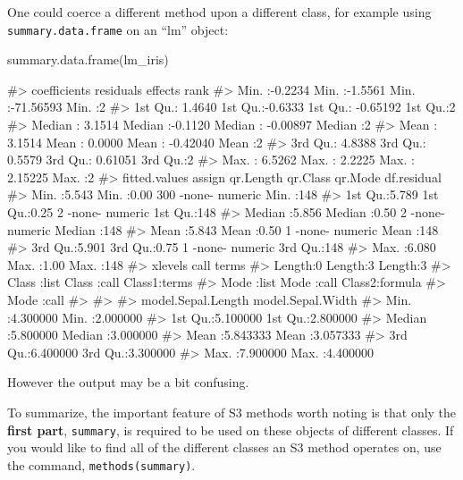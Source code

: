 One could coerce a different method upon a different class, for example
using \texttt{summary.data.frame} on an ``lm'' object:

\begin{Schunk}
\begin{Sinput}
summary.data.frame(lm_iris)
\end{Sinput}
\begin{Soutput}
#>   coefficients       residuals          effects               rank  
#>  Min.   :-0.2234   Min.   :-1.5561   Min.   :-71.56593   Min.   :2  
#>  1st Qu.: 1.4640   1st Qu.:-0.6333   1st Qu.: -0.65192   1st Qu.:2  
#>  Median : 3.1514   Median :-0.1120   Median : -0.00897   Median :2  
#>  Mean   : 3.1514   Mean   : 0.0000   Mean   : -0.42040   Mean   :2  
#>  3rd Qu.: 4.8388   3rd Qu.: 0.5579   3rd Qu.:  0.61051   3rd Qu.:2  
#>  Max.   : 6.5262   Max.   : 2.2225   Max.   :  2.15225   Max.   :2  
#>  fitted.values       assign     qr.Length  qr.Class  qr.Mode  df.residual 
#>  Min.   :5.543   Min.   :0.00   300      -none-   numeric    Min.   :148  
#>  1st Qu.:5.789   1st Qu.:0.25     2      -none-   numeric    1st Qu.:148  
#>  Median :5.856   Median :0.50     2      -none-   numeric    Median :148  
#>  Mean   :5.843   Mean   :0.50     1      -none-   numeric    Mean   :148  
#>  3rd Qu.:5.901   3rd Qu.:0.75     1      -none-   numeric    3rd Qu.:148  
#>  Max.   :6.080   Max.   :1.00                                Max.   :148  
#>    xlevels         call         terms        
#>  Length:0      Length:3      Length:3        
#>  Class :list   Class :call   Class1:terms    
#>  Mode  :list   Mode  :call   Class2:formula  
#>                              Mode  :call     
#>                                              
#>                                              
#>  model.Sepal.Length  model.Sepal.Width 
#>  Min.   :4.300000    Min.   :2.000000  
#>  1st Qu.:5.100000    1st Qu.:2.800000  
#>  Median :5.800000    Median :3.000000  
#>  Mean   :5.843333    Mean   :3.057333  
#>  3rd Qu.:6.400000    3rd Qu.:3.300000  
#>  Max.   :7.900000    Max.   :4.400000
\end{Soutput}
\end{Schunk}

However the output may be a bit confusing.

To summarize, the important feature of S3 methods worth noting is that
only the \textbf{first part}, \texttt{summary}, is required to be used
on these objects of different classes. If you would like to find all of
the different classes an S3 method operates on, use the command,
\texttt{methods(summary)}.

